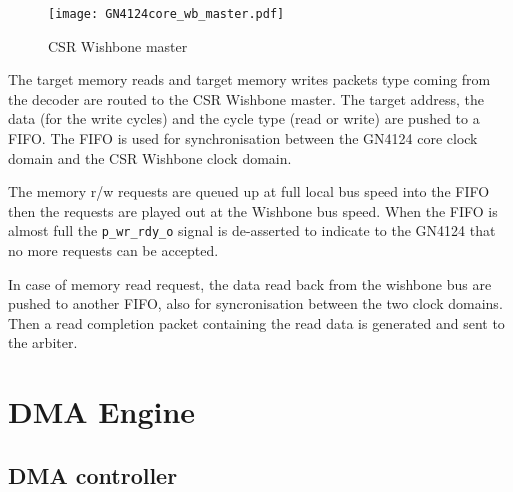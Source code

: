 \documentclass[10pt,a4paper]{cerndoc}
\begin{document}
 \begin{figure}[!ht]
  \centering
  \texttt{[image: GN4124core\_wb\_master.pdf]}
  \caption{CSR Wishbone master}
  \label{fig:GN4124core_wb_master}
 \end{figure}

 The target memory reads and target memory writes packets type coming
 from the decoder are routed to the CSR Wishbone master.
 The target address, the data (for the write cycles) and the cycle type
 (read or write) are pushed to a FIFO. The FIFO is used for
 synchronisation between the GN4124 core clock domain and the CSR
 Wishbone clock domain.

 The memory r/w requests are queued up at full local bus speed into the FIFO
 then the requests are played out at the Wishbone bus speed.
 When the FIFO is almost full the \verb+p_wr_rdy_o+ signal is
 de-asserted to indicate to the GN4124 that no more requests can be accepted.

 In case of memory read request, the data read back from the wishbone
 bus are pushed to another FIFO, also for syncronisation between the two
 clock domains. Then a read completion packet containing the read data
 is generated and sent to the arbiter.


\section{DMA Engine}

\subsection{DMA controller}
\end{document}
